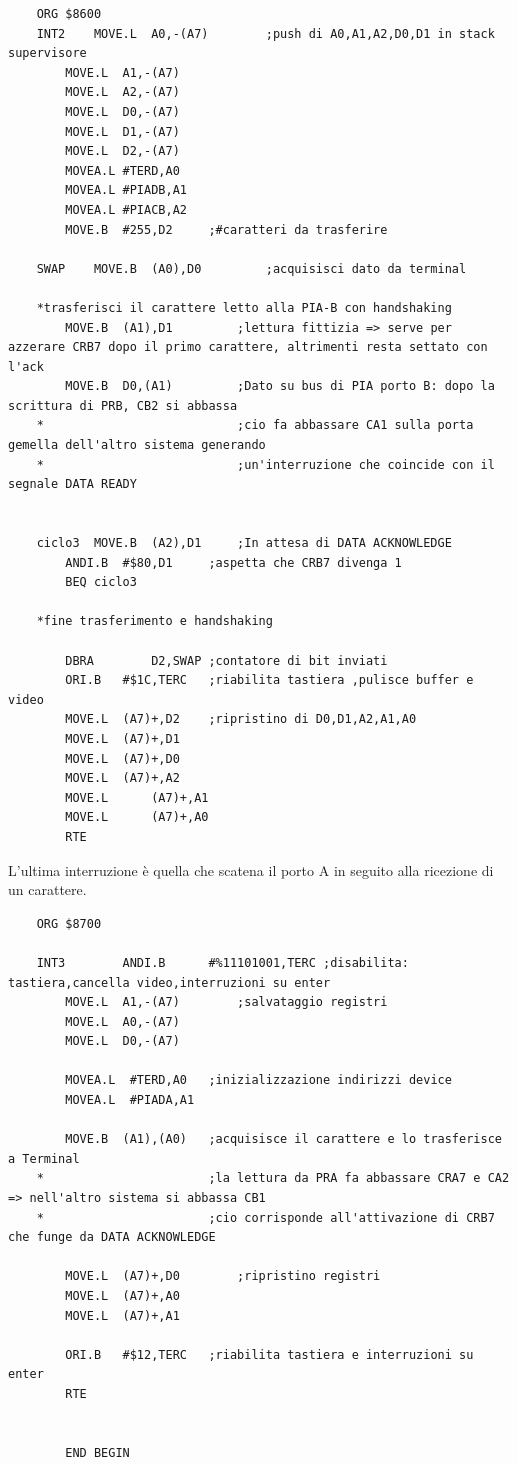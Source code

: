 \begin{lstlisting}
    ORG	$8600		
    INT2	MOVE.L	A0,-(A7)		;push di A0,A1,A2,D0,D1 in stack supervisore
        MOVE.L	A1,-(A7)
        MOVE.L	A2,-(A7)
        MOVE.L	D0,-(A7)
        MOVE.L	D1,-(A7)
        MOVE.L	D2,-(A7)
        MOVEA.L	#TERD,A0
        MOVEA.L	#PIADB,A1
        MOVEA.L	#PIACB,A2
        MOVE.B	#255,D2		;#caratteri da trasferire
        
    SWAP	MOVE.B	(A0),D0			;acquisisci dato da terminal
    
    *trasferisci il carattere letto alla PIA-B con handshaking
        MOVE.B  (A1),D1         ;lettura fittizia => serve per azzerare CRB7 dopo il primo carattere, altrimenti resta settato con l'ack
        MOVE.B  D0,(A1)         ;Dato su bus di PIA porto B: dopo la scrittura di PRB, CB2 si abbassa
    *							;cio fa abbassare CA1 sulla porta gemella dell'altro sistema generando 
    *							;un'interruzione che coincide con il segnale DATA READY
        
        
    ciclo3	MOVE.B	(A2),D1		;In attesa di DATA ACKNOWLEDGE
        ANDI.B	#$80,D1		;aspetta che CRB7 divenga 1
        BEQ	ciclo3
                
    *fine trasferimento e handshaking
            
        DBRA    	D2,SWAP	;contatore di bit inviati	
        ORI.B	#$1C,TERC	;riabilita tastiera ,pulisce buffer e video
        MOVE.L	(A7)+,D2	;ripristino di D0,D1,A2,A1,A0
        MOVE.L 	(A7)+,D1
        MOVE.L	(A7)+,D0
        MOVE.L	(A7)+,A2
        MOVE.L  	(A7)+,A1
        MOVE.L  	(A7)+,A0
        RTE
\end{lstlisting}

L'ultima interruzione è quella che scatena il porto A in seguito alla ricezione di un carattere. 

\begin{lstlisting}
    ORG $8700		

    INT3    	ANDI.B		#%11101001,TERC	;disabilita: tastiera,cancella video,interruzioni su enter		 
        MOVE.L  A1,-(A7)		;salvataggio registri
        MOVE.L  A0,-(A7)
        MOVE.L  D0,-(A7)
    
        MOVEA.L  #TERD,A0	;inizializzazione indirizzi device
        MOVEA.L  #PIADA,A1
        
        MOVE.B 	(A1),(A0)	;acquisisce il carattere e lo trasferisce a Terminal
    *						;la lettura da PRA fa abbassare CRA7 e CA2 => nell'altro sistema si abbassa CB1
    *						;cio corrisponde all'attivazione di CRB7 che funge da DATA ACKNOWLEDGE
        
        MOVE.L  (A7)+,D0		;ripristino registri 
        MOVE.L  (A7)+,A0
        MOVE.L  (A7)+,A1
        
        ORI.B	#$12,TERC	;riabilita tastiera e interruzioni su enter 
        RTE
    
    
        END	BEGIN
\end{lstlisting}

